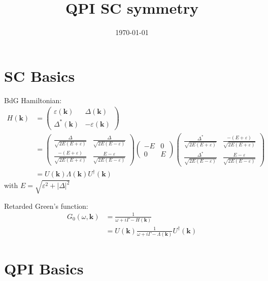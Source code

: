 \documentclass[10pt]{article}
\newcommand{\bk}{\boldsymbol{k}}
\begin{document}
\title{QPI SC symmetry}
\date{\today}

\maketitle

\tableofcontents

\section{SC Basics}

BdG Hamiltonian:
\begin{align}
    H (\bk)  &= \begin{pmatrix}
        \varepsilon (\bk) & \Delta (\bk) \\
        \Delta^{*} (\bk) & -\varepsilon (\bk)
    \end{pmatrix} \\
    &= \begin{pmatrix}
        \frac{\Delta}{\sqrt{2E (E + \varepsilon )}} & \frac{\Delta}{\sqrt{2E (E - \varepsilon)}} \\
        \frac{-(E+\varepsilon)}{\sqrt{2E (E + \varepsilon )}} & \frac{E - \varepsilon}{\sqrt{2E (E - \varepsilon)}}
    \end{pmatrix}
    \begin{pmatrix}
        - E & 0 \\
        0 & E
    \end{pmatrix}
    \begin{pmatrix}
        \frac{\Delta^*}{\sqrt{2E (E + \varepsilon )}} &  \frac{-(E+\varepsilon)}{\sqrt{2E (E + \varepsilon )}}\\
        \frac{\Delta^*}{\sqrt{2E (E - \varepsilon)}} & \frac{E - \varepsilon}{\sqrt{2E (E - \varepsilon)}}
    \end{pmatrix} \\
    &= U (\bk) \Lambda (\bk) U^\dagger (\bk)
\end{align}
with $E = \sqrt{\varepsilon^2 + |\Delta|^2}$

Retarded Green's function:
\begin{align}
    G_0 (\omega, \bk) &= \frac{1}{ \omega + i \Gamma - H (\bk) } \\
    &= U (\bk) \frac{1}{ \omega + i \Gamma - \Lambda (\bk) } U^\dagger (\bk)
\end{align}

\section{QPI Basics}
\end{document}
